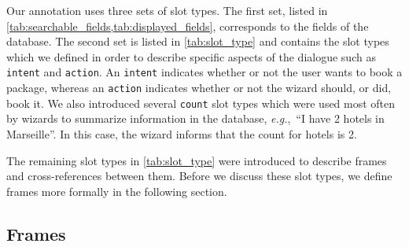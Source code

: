 \documentclass{article}
\theoremstyle{definition}
\begin{document}
Our annotation uses three sets of slot types. The first set, listed in \cref{tab:searchable_fields,tab:displayed_fields}, corresponds to the fields of the database.
The second set is listed in \cref{tab:slot_type} and contains the slot types which we defined in order to describe specific aspects of the dialogue such as \texttt{intent} and \texttt{action}. An \texttt{intent} indicates whether or not the user wants to book a package, whereas an \texttt{action} indicates whether or not the wizard should, or did, book it.
%
We also introduced several \texttt{count} slot types which were used most often by wizards to summarize information in the database, \textit{e.g.},~``I have 2 hotels in Marseille''. In this case, the wizard informs that the count for hotels is 2.

The remaining slot types in \cref{tab:slot_type} were introduced to describe frames and cross-references between them.
Before we discuss these slot types, we define frames more formally in the following section.

\subsection{Frames}
\end{document}
